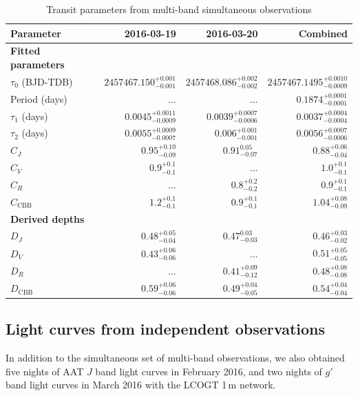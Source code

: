 \documentclass[iop,useAMES,usenatbig]{emulateapj}
\begin{document}
\begin{table}
\centering
\caption{\label{tab:simultaneous_params}Transit parameters from multi-band simultaneous observations}
\begin{tabular}{lrrr}
\hline\hline
Parameter & 2016-03-19 & 2016-03-20 & Combined\\
\hline
\textbf{Fitted parameters} & & & \\
$\tau_0$ (BJD-TDB) & $2457467.150_{-0.001}^{+0.001}$ & $2457468.086_{-0.002}^{+0.002}$ & $2457467.1495_{-0.0009}^{+0.0010}$\\
Period (days) & ... & ... & $0.1874_{-0.0001}^{+0.0001}$ \\ 
$\tau_1$ (days) & $0.0045_{-0.0009}^{+0.0011}$ & $0.0039_{-0.0006}^{+0.0007}$ & $0.0037_{-0.0004}^{+0.0004}$ \\
$\tau_2$ (days) & $0.0055_{-0.0007}^{+0.0009}$ & $0.006_{-0.001}^{+0.001}$ & $0.0056_{-0.0006}^{+0.0007}$ \\
$C_J$ & $0.95_{-0.09}^{+0.10}$ & $0.91_{-0.07}^{0.05}$ & $0.88_{-0.04}^{+0.06}$ \\
$C_V$ & $0.9_{-0.1}^{+0.1}$ & ... & $1.0_{-0.1}^{+0.1}$\\
$C_R$ & ... & $0.8_{-0.2}^{+0.2}$ & $0.9_{-0.1}^{+0.1}$ \\
$C_\mathrm{CBB}$ & $1.2_{-0.1}^{+0.1}$ & $0.9_{-0.1}^{+0.1}$ & $1.04_{-0.09}^{+0.08}$ \\
\textbf{Derived depths} && \\
$D_J$ & $0.48_{-0.04}^{+0.05}$ & $0.47_{-0.03}^{0.03}$ & $0.46_{-0.02}^{+0.03}$\\
$D_V$ & $0.43_{-0.06}^{+0.06}$ & ... & $0.51_{-0.05}^{+0.05}$\\
$D_R$ & ... & $0.41_{-0.12}^{+0.09}$ & $0.48_{-0.08}^{+0.08}$\\
$D_\mathrm{CBB}$ & $0.59_{-0.06}^{+0.06}$ & $0.49_{-0.05}^{+0.04}$ & $0.54_{-0.04}^{+0.04}$ \\
\hline
\end{tabular}
\end{table}

\subsection{Light curves from independent observations}

In addition to the simultaneous set of multi-band observations, we also obtained five nights of AAT $J$ band light curves in February 2016, and two nights of $g'$ band light curves in March 2016 with the LCOGT 1\,m network. 
\end{document}
